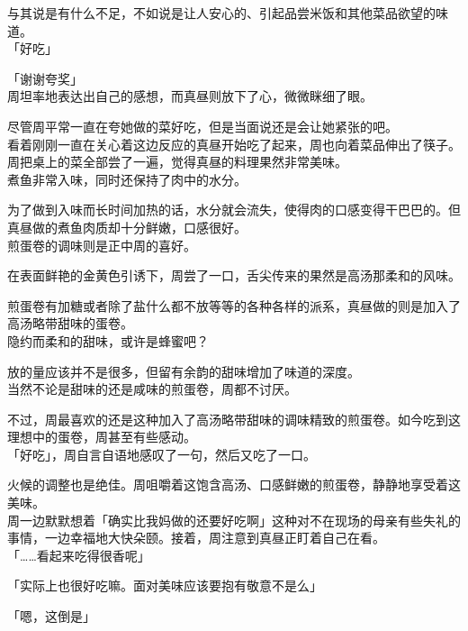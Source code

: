 与其说是有什么不足，不如说是让人安心的、引起品尝米饭和其他菜品欲望的味道。\\

「好吃」

「谢谢夸奖」\\

周坦率地表达出自己的感想，而真昼则放下了心，微微眯细了眼。

尽管周平常一直在夸她做的菜好吃，但是当面说还是会让她紧张的吧。\\

看着刚刚一直在关心着这边反应的真昼开始吃了起来，周也向着菜品伸出了筷子。\\

周把桌上的菜全部尝了一遍，觉得真昼的料理果然非常美味。\\

煮鱼非常入味，同时还保持了肉中的水分。

为了做到入味而长时间加热的话，水分就会流失，使得肉的口感变得干巴巴的。但真昼做的煮鱼肉质却十分鲜嫩，口感很好。\\

煎蛋卷的调味则是正中周的喜好。

在表面鲜艳的金黄色引诱下，周尝了一口，舌尖传来的果然是高汤那柔和的风味。

煎蛋卷有加糖或者除了盐什么都不放等等的各种各样的派系，真昼做的则是加入了高汤略带甜味的蛋卷。\\

隐约而柔和的甜味，或许是蜂蜜吧？

放的量应该并不是很多，但留有余韵的甜味增加了味道的深度。\\

当然不论是甜味的还是咸味的煎蛋卷，周都不讨厌。

不过，周最喜欢的还是这种加入了高汤略带甜味的调味精致的煎蛋卷。如今吃到这理想中的蛋卷，周甚至有些感动。\\

「好吃」，周自言自语地感叹了一句，然后又吃了一口。

火候的调整也是绝佳。周咀嚼着这饱含高汤、口感鲜嫩的煎蛋卷，静静地享受着这美味。\\

周一边默默想着「确实比我妈做的还要好吃啊」这种对不在现场的母亲有些失礼的事情，一边幸福地大快朵颐。接着，周注意到真昼正盯着自己在看。\\

「……看起来吃得很香呢」

「实际上也很好吃嘛。面对美味应该要抱有敬意不是么」

「嗯，这倒是」

